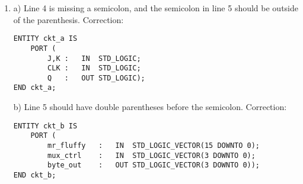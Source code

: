 \begin{enumerate}
	\item a) Line 4 is missing a semicolon, and the semicolon in line 5 should be outside of the parenthesis. Correction:
	
	\begin{minipage}{1\linewidth}
		\begin{lstlisting}[]
ENTITY ckt_a IS
	PORT (
		J,K	:	IN	STD_LOGIC;
		CLK	:	IN	STD_LOGIC;
		Q	:	OUT	STD_LOGIC);
END ckt_a;
		\end{lstlisting}
	\end{minipage}
		
	b) Line 5 should have double parentheses before the semicolon. \mbox{Correction:}
	
	\begin{minipage}{1\linewidth}
		\begin{lstlisting}[]
ENTITY ckt_b IS
	PORT (
		mr_fluffy	:	IN	STD_LOGIC_VECTOR(15 DOWNTO 0);
		mux_ctrl	:	IN	STD_LOGIC_VECTOR(3 DOWNTO 0);
		byte_out	:	OUT	STD_LOGIC_VECTOR(3 DOWNTO 0));
END ckt_b;
		\end{lstlisting}
	\end{minipage}
	
\end{enumerate}

